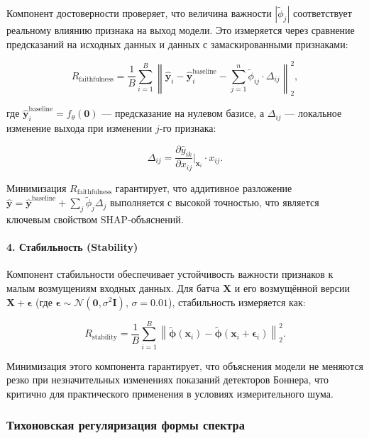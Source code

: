 Компонент достоверности проверяет, что величина важности $|\tilde{\phi}_j|$ соответствует реальному влиянию признака на выход модели. Это измеряется через сравнение предсказаний на исходных данных и данных с замаскированными признаками:

\begin{equation}
R_{\text{faithfulness}} = \frac{1}{B} \sum_{i=1}^{B} \left\| \hat{\mathbf{y}}_i - \hat{\mathbf{y}}_i^{\text{baseline}} - \sum_{j=1}^{n} \tilde{\phi}_{ij} \cdot \Delta_{ij} \right\|_2^2,
\end{equation}

где $\hat{\mathbf{y}}_i^{\text{baseline}} = f_{\theta}(\mathbf{0})$ --- предсказание на нулевом базисе, а $\Delta_{ij}$ --- локальное изменение выхода при изменении $j$-го признака:

\begin{equation}
\Delta_{ij} = \frac{\partial \hat{y}_{ik}}{\partial x_{ij}} \Big|_{\mathbf{x}_i} \cdot x_{ij}.
\end{equation}

Минимизация $R_{\text{faithfulness}}$ гарантирует, что аддитивное разложение $\hat{\mathbf{y}} = \hat{\mathbf{y}}^{\text{baseline}} + \sum_j \tilde{\phi}_j \Delta_j$ выполняется с высокой точностью, что является ключевым свойством SHAP-объяснений.

\paragraph{4. Стабильность (Stability)}

Компонент стабильности обеспечивает устойчивость важности признаков к малым возмущениям входных данных. Для батча $\mathbf{X}$ и его возмущённой версии $\mathbf{X} + \boldsymbol{\epsilon}$ (где $\boldsymbol{\epsilon} \sim \mathcal{N}(\mathbf{0}, \sigma^2 \mathbf{I})$, $\sigma = 0.01$), стабильность измеряется как:

\begin{equation}
R_{\text{stability}} = \frac{1}{B} \sum_{i=1}^{B} \left\| \tilde{\boldsymbol{\phi}}(\mathbf{x}_i) - \tilde{\boldsymbol{\phi}}(\mathbf{x}_i + \boldsymbol{\epsilon}_i) \right\|_2^2.
\end{equation}

Минимизация этого компонента гарантирует, что объяснения модели не меняются резко при незначительных изменениях показаний детекторов Боннера, что критично для практического применения в условиях измерительного шума.

\subsubsection{Тихоновская регуляризация формы спектра}

